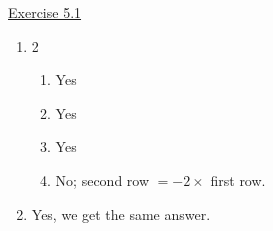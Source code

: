 
\underline{Exercise 5.1}
\begin{enumerate}

\item[3.]
\begin{multicols}{2}
\begin{enumerate}
\item[(a)] Yes
\item[(b)] Yes
\item[(c)] Yes
\item[(d)] No; second row $= -2 \times$ first row.
\end{enumerate}
\end{multicols}

\item[4.] Yes, we get the same answer.

\end{enumerate}
